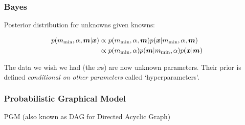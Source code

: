 \documentclass{beamer}
\begin{document}
\begin{frame}[t,plain]
\frametitle{Bayes}
Posterior distribution for unknowns given knowns:\vspace{1.5em}

\begin{align}
p(m_{\rm min}, \alpha, \boldsymbol{m} | \boldsymbol{x})
  &\propto
    p(m_{\rm min}, \alpha, \boldsymbol{m})
    p(\boldsymbol{x} | m_{\rm min}, \alpha, \boldsymbol{m})\\
  &\propto
    p(m_{\rm min}, \alpha)p(\boldsymbol{m} | m_{\rm min}, \alpha)
    p(\boldsymbol{x} | \boldsymbol{m}) 
\end{align}

The data we wish we had (the $x$s) are now unknown parameters.
Their prior is defined {\em conditional on other parameters} called
`hyperparameters'.


\end{frame}


\begin{frame}[t,plain]
\frametitle{Probabilistic Graphical Model}
PGM (also known as DAG for Directed Acyclic Graph)

\end{frame}
\end{document}
